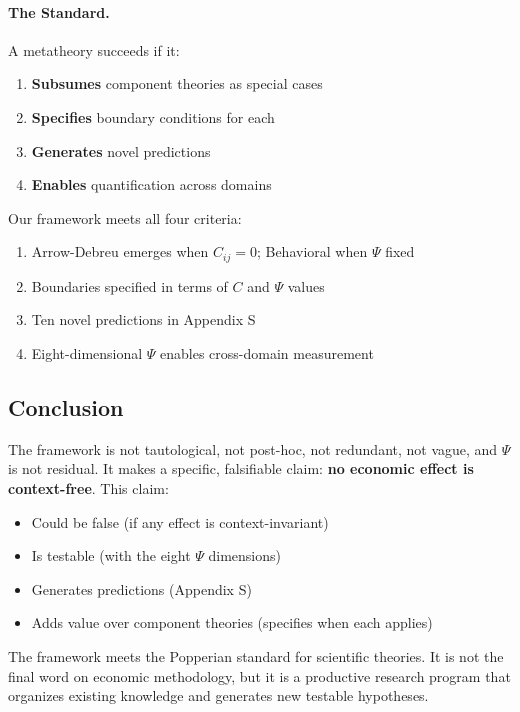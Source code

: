 \paragraph{The Standard.}
A metatheory succeeds if it:
\begin{enumerate}
    \item \textbf{Subsumes} component theories as special cases
    \item \textbf{Specifies} boundary conditions for each
    \item \textbf{Generates} novel predictions
    \item \textbf{Enables} quantification across domains
\end{enumerate}

Our framework meets all four criteria:
\begin{enumerate}
    \item Arrow-Debreu emerges when $C_{ij} = 0$; Behavioral when $\Psi$ fixed
    \item Boundaries specified in terms of $C$ and $\Psi$ values
    \item Ten novel predictions in Appendix S
    \item Eight-dimensional $\Psi$ enables cross-domain measurement
\end{enumerate}

\subsection{Conclusion}

The framework is not tautological, not post-hoc, not redundant, not vague, and $\Psi$ is not residual. It makes a specific, falsifiable claim: \textbf{no economic effect is context-free}. This claim:

\begin{itemize}
    \item Could be false (if any effect is context-invariant)
    \item Is testable (with the eight $\Psi$ dimensions)
    \item Generates predictions (Appendix S)
    \item Adds value over component theories (specifies when each applies)
\end{itemize}

The framework meets the Popperian standard for scientific theories. It is not the final word on economic methodology, but it is a productive research program that organizes existing knowledge and generates new testable hypotheses.

